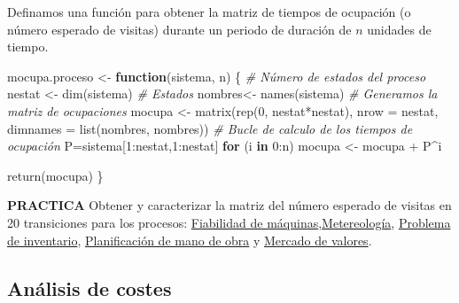 \documentclass[
]{book}
\newenvironment{Shaded}{\begin{snugshade}}{\end{snugshade}}
\newcommand{\AttributeTok}[1]{\textcolor[rgb]{0.77,0.63,0.00}{#1}}
\newcommand{\CommentTok}[1]{\textcolor[rgb]{0.56,0.35,0.01}{\textit{#1}}}
\newcommand{\ControlFlowTok}[1]{\textcolor[rgb]{0.13,0.29,0.53}{\textbf{#1}}}
\newcommand{\DecValTok}[1]{\textcolor[rgb]{0.00,0.00,0.81}{#1}}
\newcommand{\FunctionTok}[1]{\textcolor[rgb]{0.00,0.00,0.00}{#1}}
\newcommand{\NormalTok}[1]{#1}
\newcommand{\OtherTok}[1]{\textcolor[rgb]{0.56,0.35,0.01}{#1}}
\newcommand{\SpecialCharTok}[1]{\textcolor[rgb]{0.00,0.00,0.00}{#1}}
\newenvironment{bluebox}{
  \definecolor{shadecolor}{rgb}{176, 196, 222}  
  \color{black}
  \begin{shaded}}
 {\end{shaded}}
\newenvironment{whitebox}{
  \definecolor{shadecolor}{rgb}{255, 255, 255}  
  \color{black}
  \begin{shaded}}
 {\end{shaded}}
\theoremstyle{definition}
\theoremstyle{definition}
\theoremstyle{definition}
\theoremstyle{definition}
\theoremstyle{remark}
\begin{document}
\begin{whitebox}

Definamos una función para obtener la matriz de tiempos de ocupación (o número esperado de visitas) durante un periodo de duración de \(n\) unidades de tiempo.

\begin{Shaded}
\begin{Highlighting}[]
\NormalTok{mocupa.proceso }\OtherTok{\textless{}{-}} \ControlFlowTok{function}\NormalTok{(sistema, n)}
\NormalTok{\{}
  \CommentTok{\# Número de estados del proceso}
\NormalTok{  nestat }\OtherTok{\textless{}{-}} \FunctionTok{dim}\NormalTok{(sistema)}
  \CommentTok{\# Estados}
\NormalTok{  nombres}\OtherTok{\textless{}{-}} \FunctionTok{names}\NormalTok{(sistema)}
  \CommentTok{\# Generamos la matriz de ocupaciones}
\NormalTok{  mocupa }\OtherTok{\textless{}{-}} \FunctionTok{matrix}\NormalTok{(}\FunctionTok{rep}\NormalTok{(}\DecValTok{0}\NormalTok{, nestat}\SpecialCharTok{*}\NormalTok{nestat),}
                 \AttributeTok{nrow =}\NormalTok{ nestat, }\AttributeTok{dimnames =} \FunctionTok{list}\NormalTok{(nombres, nombres))}
  \CommentTok{\# Bucle de calculo de los tiempos de ocupación}
\NormalTok{  P}\OtherTok{=}\NormalTok{sistema[}\DecValTok{1}\SpecialCharTok{:}\NormalTok{nestat,}\DecValTok{1}\SpecialCharTok{:}\NormalTok{nestat]}
  \ControlFlowTok{for}\NormalTok{ (i }\ControlFlowTok{in} \DecValTok{0}\SpecialCharTok{:}\NormalTok{n)}
\NormalTok{   mocupa }\OtherTok{\textless{}{-}}\NormalTok{ mocupa }\SpecialCharTok{+}\NormalTok{ P}\SpecialCharTok{\^{}}\NormalTok{i}
  
  \FunctionTok{return}\NormalTok{(mocupa)}
\NormalTok{\}}
\end{Highlighting}
\end{Shaded}

\end{whitebox}

\begin{bluebox}
\textbf{PRACTICA} Obtener y caracterizar la matriz del número esperado de visitas en 20 transiciones para los procesos: \protect\hyperlink{fiabilidad}{Fiabilidad de máquinas},\protect\hyperlink{meteo}{Metereología}, \protect\hyperlink{inventario}{Problema de inventario}, \protect\hyperlink{planificacion}{Planificación de mano de obra} y \protect\hyperlink{mercadovalores}{Mercado de valores}.

\end{bluebox}

\hypertarget{anuxe1lisis-de-costes}{%
\subsection{Análisis de costes}\label{anuxe1lisis-de-costes}}
\end{document}

